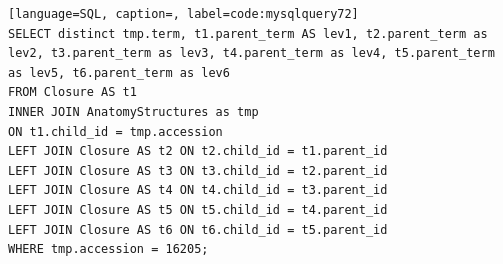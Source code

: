 \begin{lstlisting}[language=SQL, caption=, label=code:mysqlquery72]
SELECT distinct tmp.term, t1.parent_term AS lev1, t2.parent_term as lev2, t3.parent_term as lev3, t4.parent_term as lev4, t5.parent_term as lev5, t6.parent_term as lev6
FROM Closure AS t1
INNER JOIN AnatomyStructures as tmp
ON t1.child_id = tmp.accession
LEFT JOIN Closure AS t2 ON t2.child_id = t1.parent_id
LEFT JOIN Closure AS t3 ON t3.child_id = t2.parent_id
LEFT JOIN Closure AS t4 ON t4.child_id = t3.parent_id
LEFT JOIN Closure AS t5 ON t5.child_id = t4.parent_id
LEFT JOIN Closure AS t6 ON t6.child_id = t5.parent_id
WHERE tmp.accession = 16205;
\end{lstlisting}